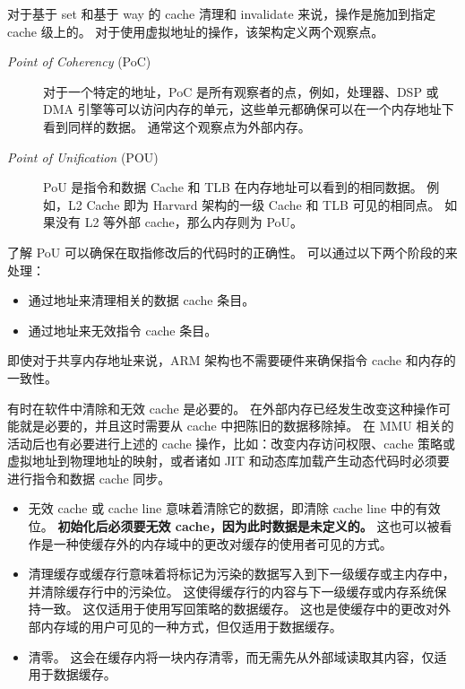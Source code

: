 
对于基于 set 和基于 way 的 cache 清理和 invalidate 来说，操作是施加到指定 cache 级上的。
对于使用虚拟地址的操作，该架构定义两个观察点。

\begin{description}
  \item[\textit{Point of Coherency} (PoC)] 对于一个特定的地址，PoC 是所有观察者的点，例如，处理器、DSP 或 DMA 引擎等可以访问内存的单元，这些单元都确保可以在一个内存地址下看到同样的数据。
    通常这个观察点为外部内存。
  \item[\textit{Point of Unification} (POU)] PoU 是指令和数据 Cache 和 TLB 在内存地址可以看到的相同数据。
    例如，L2 Cache 即为 Harvard 架构的一级 Cache 和 TLB 可见的相同点。
    如果没有 L2 等外部 cache，那么内存则为 PoU。
\end{description}

了解 PoU 可以确保在取指修改后的代码时的正确性。
可以通过以下两个阶段的来处理：

\begin{itemize}
  \item 通过地址来清理相关的数据 cache 条目。
  \item 通过地址来无效指令 cache 条目。
\end{itemize}

即使对于共享内存地址来说，ARM 架构也不需要硬件来确保指令 cache 和内存的一致性。


有时在软件中清除和无效 cache 是必要的。
在外部内存已经发生改变这种操作可能就是必要的，并且这时需要从 cache 中把陈旧的数据移除掉。
在 MMU 相关的活动后也有必要进行上述的 cache 操作，比如：改变内存访问权限、cache 策略或虚拟地址到物理地址的映射，或者诸如 JIT 和动态库加载产生动态代码时必须要进行指令和数据 cache 同步。

\begin{itemize}
  \item 无效 cache 或 cache line 意味着清除它的数据，即清除 cache line 中的有效位。
    \textbf{初始化后必须要无效 cache，因为此时数据是未定义的。}
    这也可以被看作是一种使缓存外的内存域中的更改对缓存的使用者可见的方式。
  \item 清理缓存或缓存行意味着将标记为污染的数据写入到下一级缓存或主内存中，并清除缓存行中的污染位。
    这使得缓存行的内容与下一级缓存或内存系统保持一致。
    这仅适用于使用写回策略的数据缓存。
    这也是使缓存中的更改对外部内存域的用户可见的一种方式，但仅适用于数据缓存。
  \item 清零。
    这会在缓存内将一块内存清零，而无需先从外部域读取其内容，仅适用于数据缓存。
\end{itemize}

